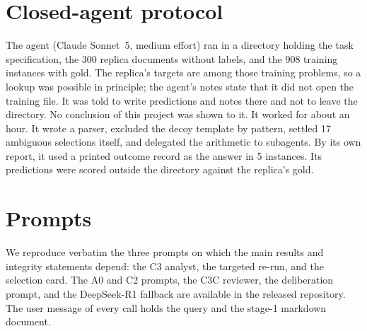 \documentclass[11pt]{article}%
\begin{document}
\section{Closed-agent protocol}
\label{app:agent}

The agent (Claude Sonnet~5, medium effort) ran in a directory holding the task specification, the 300 replica
documents without labels, and the 908 training instances with gold. The
replica's targets are among those training problems, so a lookup was
possible in principle; the agent's notes state that it did not open the
training file. It was
told to write predictions and notes there and not to leave the directory. No
conclusion of this project was shown to it. It worked for about an hour. It
wrote a parser, excluded the decoy template by pattern, settled 17 ambiguous
selections itself, and delegated the arithmetic to subagents. By its own
report, it used a printed outcome record as the answer in 5 instances. Its
predictions were scored outside the directory against the replica's gold.

\section{Prompts}
\label{app:prompts}

We reproduce verbatim the three prompts on which the main results and
integrity statements depend: the \textsc{C3} analyst, the targeted re-run, and
the selection card. The \textsc{A0} and \textsc{C2} prompts, the \textsc{C3C}
reviewer, the deliberation prompt, and the DeepSeek-R1 fallback are available
in the released repository. The user message of every call holds the query and
the stage-1 markdown document.
\end{document}
